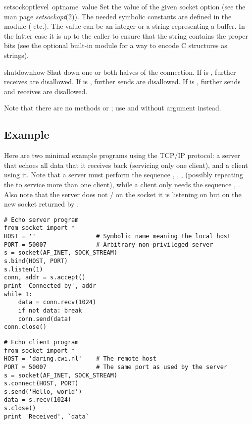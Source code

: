 \begin{funcdesc}{setsockopt}{level\, optname\, value}
Set the value of the given socket option (see the \UNIX{} man page
{\it setsockopt}(2)).  The needed symbolic constants are defined in
the  module ( etc.).  The value can be an
integer or a string representing a buffer.  In the latter case it is
up to the caller to ensure that the string contains the proper bits
(see the optional built-in module
 for a way to encode C structures as strings).
\end{funcdesc}

\begin{funcdesc}{shutdown}{how}
Shut down one or both halves of the connection.  If  is ,
further receives are disallowed.  If  is , further sends are
disallowed.  If  is , further sends and receives are
disallowed.
\end{funcdesc}

Note that there are no methods  or ; use
 and  without  argument instead.

\subsection{Example}

Here are two minimal example programs using the TCP/IP protocol: a
server that echoes all data that it receives back (servicing only one
client), and a client using it.  Note that a server must perform the
sequence , , , 
(possibly repeating the  to service more than one client),
while a client only needs the sequence , .
Also note that the server does not / on the
socket it is listening on but on the new socket returned by
.

\bcode\begin{verbatim}
# Echo server program
from socket import *
HOST = ''                 # Symbolic name meaning the local host
PORT = 50007              # Arbitrary non-privileged server
s = socket(AF_INET, SOCK_STREAM)
s.bind(HOST, PORT)
s.listen(1)
conn, addr = s.accept()
print 'Connected by', addr
while 1:
    data = conn.recv(1024)
    if not data: break
    conn.send(data)
conn.close()
\end{verbatim}\ecode

\bcode\begin{verbatim}
# Echo client program
from socket import *
HOST = 'daring.cwi.nl'    # The remote host
PORT = 50007              # The same port as used by the server
s = socket(AF_INET, SOCK_STREAM)
s.connect(HOST, PORT)
s.send('Hello, world')
data = s.recv(1024)
s.close()
print 'Received', `data`
\end{verbatim}\ecode
